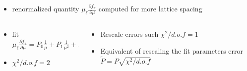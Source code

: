 \documentclass[xcolor={dvipsnames,table}]{beamer}
\begin{document}
\begin{frame}
  \begin{itemize}
    \item renormalized quantity $\mu_\ell  \frac{\partial f_\pi }{\partial\mu}$ computed for more lattice spacing
  \end{itemize}
  \begin{columns}
    \begin{column}{0.5\textwidth}
      \begin{itemize}
        \item fit $\mu_\ell  \frac{\partial f_\pi }{\partial\mu} = P_0\frac{1}{\mu} +P_1\frac{1}{\mu^2}+P_2\frac{1}{\mu^2}$
        \item $\chi^2/d.o.f=2$
      \end{itemize}
    \end{column}
    \begin{column}{0.5\textwidth}
      \begin{itemize}
        \item<2-> Rescale errors such $\chi^2/d.o.f=1$
        \item<2-> Equivalent of rescaling the fit parameters error $\tilde P = P \sqrt{\chi^2/d.o.f}$
      \end{itemize}
    \end{column}
  \end{columns}


\end{frame}
\end{document}

